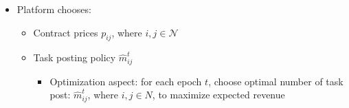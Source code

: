 \documentclass[trsc,nonblindrev]{informs3noheader}
\begin{document}
\begin{itemize}
    \begin{itemize}
    \item We model a stable matching problem between workers from worker set $\mathcal{W}^t$ and task trips from task set $\mathcal{M}^t$
    
    \item We think of workers as greedy: when they are available, they choose the job with highest profit that they can get. A job is obtained by the nearest available worker.
    \end{itemize}
    

     \item Platform chooses:

\begin{itemize}
    \item Contract prices $p_{ij}$, where $i,j\in \mathcal{N}$
    \item Task posting policy $\hat{m}_{ij}^t$ 
    
    \begin{itemize}
        \item Optimization aspect: for each epoch $t$, choose optimal number of task post: $\hat{m}_{ij}^t$, where $i,j\in N$, to maximize expected revenue
    \end{itemize}

\end{itemize}

\newpage


\end{itemize}
\end{document}
